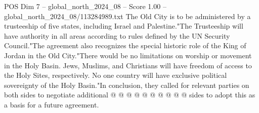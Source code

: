 \begin{textsample}{POS Dim 7 – global\_north\_2024\_08 – Score 1.00 – global\_north\_2024\_08/113284989.txt}
The Old City is to be administered by a trusteeship of five states, including Israel and Palestine."The Trusteeship will have authority in all areas according to rules defined by the UN Security Council."The agreement also recognizes the special historic role of the King of Jordan in the Old City."There would be no limitations on worship or movement in the Holy Basin.
Jews, Muslims, and Christians will have freedom of access to the Holy Sites, respectively.
No one country will have exclusive political sovereignty of the Holy Basin."In conclusion, they called for relevant parties on both sides to negotiate additional @ @ @ @ @ @ @ @ @ @ sides to adopt this as a basis for a future agreement.

\end{textsample}
